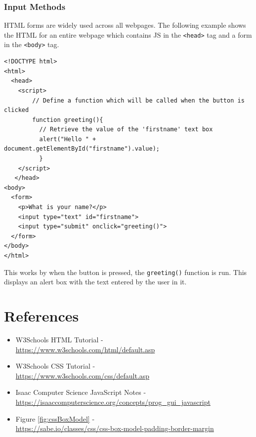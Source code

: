 \documentclass{thomasClass}
\begin{document}
\subsection{Input Methods}
HTML forms are widely used across all webpages. The following example shows the HTML for an entire webpage which contains JS in the \verb|<head>| tag and a form in the \verb|<body>| tag. 
\begin{Verbatim}[breaklines=true, breakanywhere=true]
<!DOCTYPE html>
<html>
  <head>
    <script>
        // Define a function which will be called when the button is clicked
        function greeting(){
          // Retrieve the value of the 'firstname' text box
          alert("Hello " + document.getElementById("firstname").value);
          }
    </script>
   </head>
<body>
  <form>
    <p>What is your name?</p> 
    <input type="text" id="firstname">
    <input type="submit" onclick="greeting()">
  </form>
</body>
</html>

\end{Verbatim}
This works by when the button is pressed, the \verb|greeting()| function is run. This displays an alert box with the text entered by the user in it. 


\chapter{References}
\begin{itemize}
    \item W3Schools HTML Tutorial -\\ \href{https://www.w3schools.com/html/default.asp}{https://www.w3schools.com/html/default.asp}
    \item W3Schools CSS Tutorial -\\ \href{https://www.w3schools.com/css/default.asp}{https://www.w3schools.com/css/default.asp}
    \item Isaac Computer Science JavaScript Notes -\\ \href{https://isaaccomputerscience.org/concepts/prog\_gui\_javascript}{https://isaaccomputerscience.org/concepts/prog\_gui\_javascript}
    \item Figure \ref{fig:cssBoxModel} -\\ \href{https://sabe.io/classes/css/css-box-model-padding-border-margin}{https://sabe.io/classes/css/css-box-model-padding-border-margin}
\end{itemize}
\end{document}
